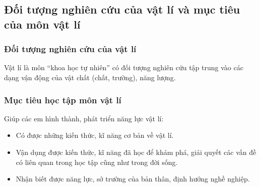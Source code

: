 

\subsection{Đối tượng nghiên cứu của vật lí và mục tiêu của môn vật lí}
\subsubsection{Đối tượng nghiên cứu của vật lí}
Vật lí là môn ``khoa học tự nhiên'' có đối tượng nghiên cứu tập trung vào các dạng vận động của vật chất (chất, trường), năng lượng.
\subsubsection{Mục tiêu học tập môn vật lí}
Giúp các em hình thành, phát triển năng lực vật lí:
\begin{itemize}
	\item Có được những kiến thức, kĩ năng cơ bản về vật lí.
	\item Vận dụng được kiến thức, kĩ năng đã học để khám phá, giải quyết các vấn đề có liên quan trong học tập cũng như trong đời sống.
	\item Nhận biết được năng lực, sở trường của bản thân, định hướng nghề nghiệp.
\end{itemize}
